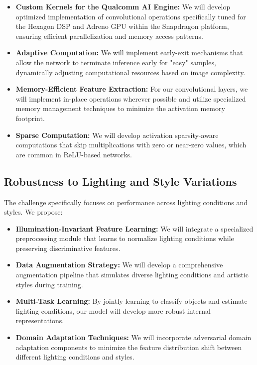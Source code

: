 \documentclass[11pt, oneside]{article}   	%
\begin{document}
\begin{itemize}
	\item \textbf{Custom Kernels for the Qualcomm AI Engine:} We will develop optimized implementation of convolutional operations specifically tuned for the Hexagon DSP and Adreno GPU within the Snapdragon platform, ensuring efficient parallelization and memory access patterns.

	\item \textbf{Adaptive Computation:} We will implement early-exit mechanisms that allow the network to terminate inference early for "easy" samples, dynamically adjusting computational resources based on image complexity.

	\item \textbf{Memory-Efficient Feature Extraction:} For our convolutional layers, we will implement in-place operations wherever possible and utilize specialized memory management techniques to minimize the activation memory footprint.

	\item \textbf{Sparse Computation:} We will develop activation sparsity-aware computations that skip multiplications with zero or near-zero values, which are common in ReLU-based networks.
\end{itemize}

\subsection*{Robustness to Lighting and Style Variations}

The challenge specifically focuses on performance across lighting conditions and styles. We propose:

\begin{itemize}
	\item \textbf{Illumination-Invariant Feature Learning:} We will integrate a specialized preprocessing module that learns to normalize lighting conditions while preserving discriminative features.

	\item \textbf{Data Augmentation Strategy:} We will develop a comprehensive augmentation pipeline that simulates diverse lighting conditions and artistic styles during training.

	\item \textbf{Multi-Task Learning:} By jointly learning to classify objects and estimate lighting conditions, our model will develop more robust internal representations.

	\item \textbf{Domain Adaptation Techniques:} We will incorporate adversarial domain adaptation components to minimize the feature distribution shift between different lighting conditions and styles.
\end{itemize}
\end{document}
